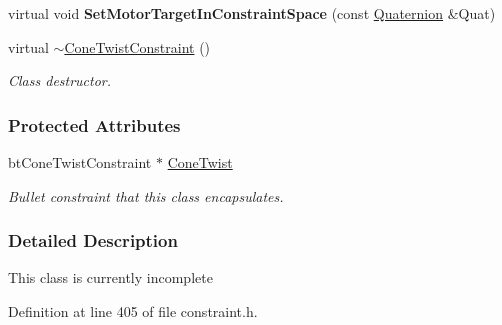 \begin{DoxyCompactItemize}
\item 
\hypertarget{classMezzanine_1_1ConeTwistConstraint_a846d9d18b94603b3fcc8fb83510d4510}{
virtual void {\bfseries SetMotorTargetInConstraintSpace} (const \hyperlink{classMezzanine_1_1Quaternion}{Quaternion} \&Quat)}
\label{classMezzanine_1_1ConeTwistConstraint_a846d9d18b94603b3fcc8fb83510d4510}

\item 
virtual \hyperlink{classMezzanine_1_1ConeTwistConstraint_a69d510c9f0292b160d9f129f6d2db7f8}{$\sim$ConeTwistConstraint} ()
\begin{DoxyCompactList}\small\item\em Class destructor. \item\end{DoxyCompactList}\end{DoxyCompactItemize}
\subsubsection*{Protected Attributes}
\begin{DoxyCompactItemize}
\item 
\hypertarget{classMezzanine_1_1ConeTwistConstraint_a7920115fb30ebd57046b1966f5e61068}{
btConeTwistConstraint $\ast$ \hyperlink{classMezzanine_1_1ConeTwistConstraint_a7920115fb30ebd57046b1966f5e61068}{ConeTwist}}
\label{classMezzanine_1_1ConeTwistConstraint_a7920115fb30ebd57046b1966f5e61068}

\begin{DoxyCompactList}\small\item\em Bullet constraint that this class encapsulates. \item\end{DoxyCompactList}\end{DoxyCompactItemize}


\subsubsection{Detailed Description}
This class is currently incomplete 

Definition at line 405 of file constraint.h.



